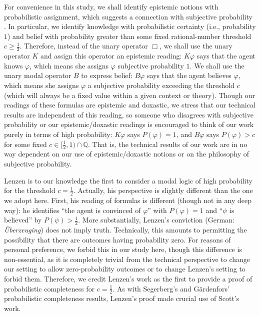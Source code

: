 \documentclass[12pt]{article}
\theoremstyle{definition}
\newcommand{\Rat}{\mathbb{Q}}  %
\begin{document}
For convenience in this study, we shall identify epistemic notions
with probabilistic assignment, which suggests a connection with
subjective probability \cite{Jeffrey2004:sptrt}.  In particular, we
identify knowledge with probabilistic certainty (i.e., probability
$1$) and belief with probability greater than some fixed
rational-number threshold $c\geq\frac 12$.  Therefore, instead of the
unary operator $\Box$, we shall use the unary operator $K$ and assign
this operator an epistemic reading: $K\varphi$ says that the agent
knows $\varphi$, which means she assigns $\varphi$ subjective
probability $1$.  We shall use the unary modal operator $B$ to express
belief: $B\varphi$ says that the agent believes $\varphi$, which means
she assigns $\varphi$ a subjective probability exceeding the threshold
$c$ (which will always be a fixed value within a given context or
theory).  Though our readings of these formulas are epistemic and
doxastic, we stress that our technical results are independent of this
reading, so someone who disagrees with subjective probability or our
epistemic/doxastic readings is encouraged to think of our work purely
in terms of high probability: $K\varphi$ says $P(\varphi)=1$, and
$B\varphi$ says $P(\varphi)>c$ for some fixed
$c\in[\frac 12,1)\cap\Rat$. That is, the technical results of our work
are in no way dependent on our use of epistemic/doxastic notions or on
the philosophy of subjective probability.

Lenzen \cite{Lenzen2003:kbasp,Lenzen1980:gwuw} is to our knowledge the
first to consider a modal logic of high probability for the threshold
$c=\frac 12$.  Actually, his perspective is slightly different than
the one we adopt here.  First, his reading of formulas is different
(though not in any deep way): he identifies ``the agent is convinced
of $\varphi$'' with $P(\varphi)=1$ and ``$\psi$ is believed'' by
$P(\psi)>\frac 12$.  More substantially, Lenzen's conviction (German:
\emph{\"{U}berzeuging}) does not imply truth.  Technically, this
amounts to permitting the possibility that there are outcomes having
probability zero.  For reasons of personal preference, we forbid this
in our study here, though this difference is non-essential, as it is
completely trivial from the technical perspective to change our
setting to allow zero-probability outcomes or to change Lenzen's
setting to forbid them. Therefore, we credit Lenzen's work
\cite{Lenzen1980:gwuw} as the first to provide a proof of
probabilistic completeness for $c=\frac 12$.  As with Segerberg's and
G{\"a}rdenfors' probabilistic completeness results, Lenzen's proof
made crucial use of Scott's work.
\end{document}
